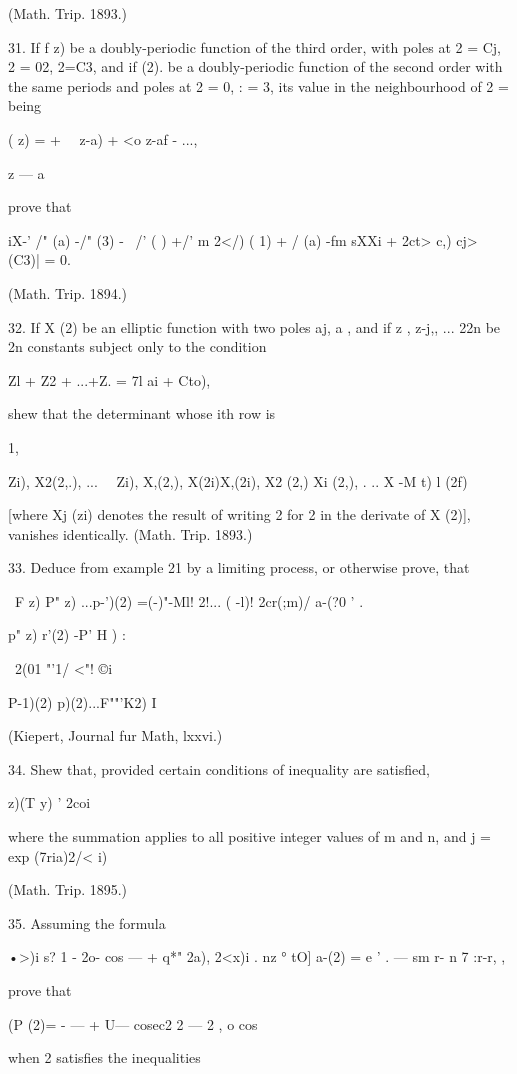 {(Math. Trip. 1893.)

31. If f z) be a doubly-periodic function of the third order, with
poles at 2 = Cj, 2 = 02, 2=C3, and if (2). be a doubly-periodic
function of the second order with the same periods and poles at 2 = 0,
: = 3, its value in the neighbourhood of 2 = being

( z) = + \ \ z-a) + <o z-af - ...,

z — a

prove that

iX-' /" (a) -/" (3) - \ /' ( ) +/' m 2</) ( 1) + / (a) -fm sXXi + 2ct>
c,) cj> (C3)| = 0.

(Math. Trip. 1894.)

32. If X (2) be an elliptic function with two poles aj, a , and if z ,
z-j,, ... 22n be 2n constants subject only to the condition

Zl + Z2 + ...+Z. = 7l ai + Cto),

shew that the determinant whose ith row is

1, \ \ {Zi), X2(2,.), ... \ \ Zi), X,(2,), X(2i)X,(2i), X2 (2,) Xi
(2,), . .. X -M t) l (2f)

[where Xj (zi) denotes the result of writing 2 for 2 in the derivate
of X (2)], vanishes identically. (Math. Trip. 1893.)

33. Deduce from example 21 by a limiting process, or otherwise prove,
that

\ F z) P" z) ...p-')(2) =(-)"-Ml! 2!... ( -l)! 2cr(;m)/ a-(?0 ' .

p" z) r'(2) -P' H ) :

\ 2(01 "'1/ <"! ©i

P-1)(2) p)(2)...F""'K2) I

(Kiepert, Journal fur Math, lxxvi.)

34. Shew that, provided certain conditions of inequality are
satisfied,

  z)(T y) ' 2coi

where the summation applies to all positive integer values of m and n,
and j = exp (7ria)2/< i)

(Math. Trip. 1895.)

35. Assuming the formula

•>)i s? 1 - 2o- cos — + q*" 2a), 2<x)i . nz ° tO] a-(2) = e ' . — sm
r- n 7 :r-r, ,

prove that

(P (2)= - — + U— cosec2 2 — 2 , o cos

when 2 satisfies the inequalities

}}
